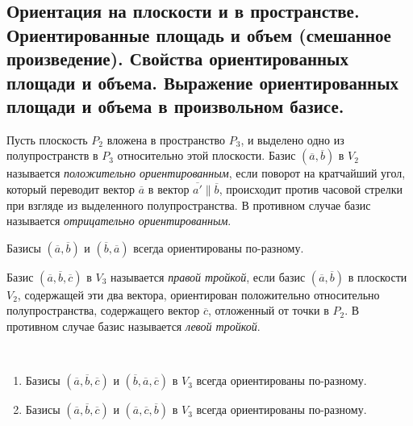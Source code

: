 \subsection{Ориентация на плоскости и в пространстве. Ориентированные площадь и объем (смешанное произведение). Свойства ориентированных площади и объема. Выражение ориентированных площади и объема в произвольном базисе.}
    
    \begin{definition}
    	Пусть плоскость $P_2$ вложена в пространство $P_3$, и выделено одно из полупространств в $P_3$ относительно этой плоскости. Базис $(\overline{a}, \overline{b})$ в $V_2$ называется \textit{положительно ориентированным}, если поворот на кратчайший угол, который переводит вектор $\overline{a}$ в вектор $\overline{a'} \parallel \overline{b}$, происходит против часовой стрелки при взгляде из выделенного полупространства. В противном случае базис называется \textit{отрицательно ориентированным}.
    \end{definition}
    
    \begin{note}
    	Базисы $(\overline{a}, \overline{b})$ и $(\overline{b}, \overline{a})$ всегда ориентированы по-разному.
    \end{note}
    
    \begin{definition}
    	Базис $(\overline{a}, \overline{b}, \overline{c})$ в $V_3$ называется \textit{правой тройкой}, если базис $(\overline{a}, \overline{b})$ в плоскости $V_2$, содержащей эти два вектора, ориентирован положительно относительно полупространства, содержащего вектор $\overline{c}$, отложенный от точки в $P_2$. В противном случае базис называется \textit{левой тройкой}.
    \end{definition}
    
    \begin{proposition}~
    	\begin{enumerate}
    		\item Базисы $(\overline{a}, \overline{b}, \overline{c})$ и $(\overline{b}, \overline{a}, \overline{c})$ в $V_3$ всегда ориентированы по-разному.
    		\item Базисы $(\overline{a}, \overline{b}, \overline{c})$ и $(\overline{a}, \overline{c}, \overline{b})$ в $V_3$ всегда ориентированы по-разному.
    	\end{enumerate}
    \end{proposition}
    
